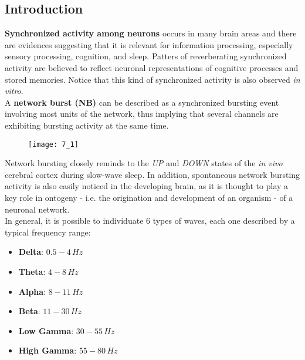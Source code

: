 \subsection{Introduction}
\textbf{Synchronized activity among neurons} occurs in many brain areas and there are evidences
suggesting that it is relevant for information processing, especially sensory
processing, cognition, and sleep. Patters of reverberating synchronized activity are
believed to reflect neuronal representations of cognitive processes and stored
memories. Notice that this kind of synchronized activity is also observed
\textit{in vitro}.\\
A \textbf{network burst (NB)} can be described as a synchronized bursting event involving most units of the network, thus implying that several channels are exhibiting bursting activity at the same time.
\begin{figure}[H]
    \texttt{[image: 7\_1]}
    \centering
\end{figure}
Network bursting closely reminds to the \textit{UP} and
\textit{DOWN} states of the \textit{in vivo} cerebral cortex during slow-wave
sleep. In addition, spontaneous network bursting activity is also easily
noticed in the developing brain, as it is thought to play a key role in
ontogeny - i.e. the origination and development of an organism -
of a neuronal network.\\
In general, it is possible to individuate 6 types of waves, each one described by a typical frequency range:
\begin{itemize}
    \item \textbf{Delta}: \(0.5-4\,Hz\)
    \item \textbf{Theta}: \(4-8\,Hz\)
    \item \textbf{Alpha}: \(8-11\,Hz\)
    \item \textbf{Beta}: \(11-30\,Hz\)
    \item \textbf{Low Gamma}: \(30-55\,Hz\)
    \item \textbf{High Gamma}: \(55-80\,Hz\)
\end{itemize}
